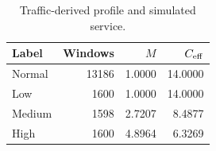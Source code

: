 \begin{table}[t]
\centering\footnotesize
\caption{Traffic-derived profile and simulated service.}
\label{tab:stress}
\begin{tabular}{@{}lrrr@{}}\toprule
Label & Windows & $M$ & $C_{\rm eff}$\\\midrule
Normal & 13186 & 1.0000 & 14.0000 \\
Low & 1600 & 1.0000 & 14.0000 \\
Medium & 1598 & 2.7207 & 8.4877 \\
High & 1600 & 4.8964 & 6.3269 \\
\bottomrule\end{tabular}
\end{table}
